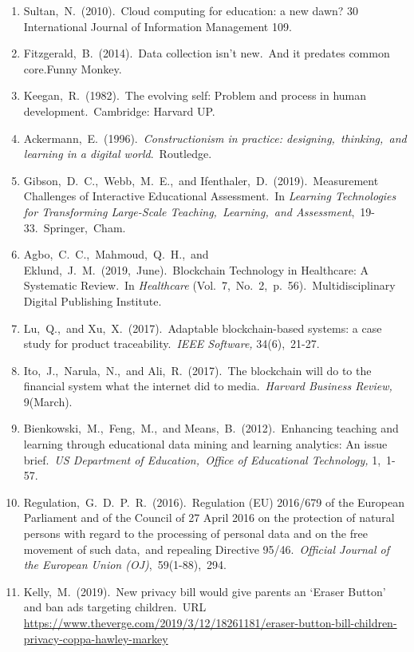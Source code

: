 \documentclass{article}
\begin{document}
\begin{enumerate}
    \label{sec:12}
    \item Sultan,\ N.\ (2010).\ Cloud computing for education: a new dawn? 30 International Journal of Information Management  109.
    \label{sec:13}
    \item Fitzgerald,\ B.\ (2014).\ Data collection isn't new.\ And it predates common core.Funny Monkey.
    \label{sec:14}
    \item Keegan,\ R.\ (1982).\ The evolving self: Problem and process in human development.\ Cambridge: Harvard UP.
    \label{sec:15}
    \item Ackermann,\ E.\ (1996).\ \textit{Constructionism in practice: designing,\ thinking,\ and learning in a digital world}.\ Routledge.
    \label{sec:16}
    \item Gibson,\ D.\ C.,\ Webb,\ M.\ E.,\ and Ifenthaler,\ D.\ (2019).\ Measurement Challenges of Interactive Educational Assessment.\ In \textit{Learning Technologies for Transforming Large-Scale Teaching,\ Learning,\ and Assessment},\ 19-33.\ Springer,\ Cham.
    \label{sec:17}
    \item Agbo,\ C.\ C.,\ Mahmoud,\ Q.\ H.,\ and Eklund,\ J.\ M.\ (2019,\ June).\ Blockchain Technology in Healthcare: A Systematic Review.\ In \textit{Healthcare} (Vol.\ 7,\ No.\ 2,\ p.\ 56).\ Multidisciplinary Digital Publishing Institute.
    \label{sec:18}
    \item Lu,\ Q.,\ and Xu,\ X.\ (2017).\ Adaptable blockchain-based systems: a case study for product traceability.\ \textit{IEEE Software,} 34(6),\ 21-27.
    \label{sec:19}
    \item Ito,\ J.,\ Narula,\ N.,\ and Ali,\ R.\ (2017).\ The blockchain will do to the financial system what the internet did to media.\ \textit{Harvard Business Review,} 9(March).
    \label{sec:20}
    \item Bienkowski,\ M.,\ Feng,\ M.,\ and Means,\ B.\ (2012).\ Enhancing teaching and learning through educational data mining and learning analytics: An issue brief.\ \textit{US Department of Education,\ Office of Educational Technology,} 1,\ 1-57.\ 
    \label{sec:21}
    \item Regulation,\ G.\ D.\ P.\ R.\ (2016).\ Regulation (EU) 2016/679 of the European Parliament and of the Council of 27 April 2016 on the protection of natural persons with regard to the processing of personal data and on the free movement of such data,\ and repealing Directive 95/46.\ \textit{Official Journal of the European Union (OJ)},\ 59(1-88),\ 294.
    \label{sec:22}
    \item Kelly,\ M.\ (2019).\ New privacy bill would give parents an ‘Eraser Button’ and ban ads targeting children.\ URL \url{https://www.theverge.com/2019/3/12/18261181/eraser-button-bill-children-privacy-coppa-hawley-markey}

\end{enumerate}
\end{document}
